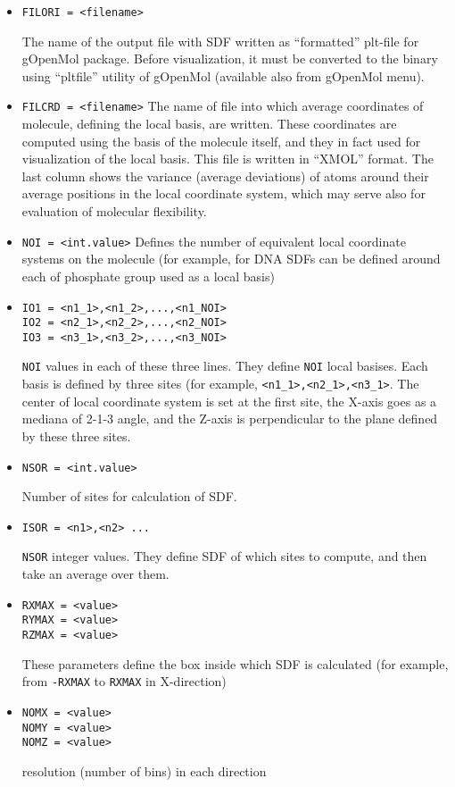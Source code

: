 \documentclass{article}
\begin{document}
\begin{itemize}

\item
\verb|FILORI = <filename>|

The name of the output file with SDF written as ``formatted'' plt-file
for gOpenMol package. Before visualization, it must be converted to the
binary using ``pltfile'' utility of gOpenMol (available also from gOpenMol 
menu).

\item
\verb|FILCRD = <filename>| 
The name of file into which average coordinates of molecule, defining the
local basis, are written. These coordinates are computed using the basis of
the molecule itself, and they in fact used for visualization of the local
basis. This file is written in ``XMOL'' format. The last column shows the
variance (average deviations) of atoms around their average positions in
the local coordinate system, which may serve also for evaluation of molecular
flexibility.

\item
\verb|NOI = <int.value>|
Defines the number of equivalent local coordinate systems on the molecule
(for example, for DNA SDFs can be defined around each of phosphate group 
used as a local basis)

\item
\begin{verbatim}
IO1 = <n1_1>,<n1_2>,...,<n1_NOI>
IO2 = <n2_1>,<n2_2>,...,<n2_NOI>
IO3 = <n3_1>,<n3_2>,...,<n3_NOI>
\end{verbatim}

\verb|NOI| values in each of these three lines. They define \verb|NOI|
local basises. Each basis is defined by three sites (for example,
\verb|<n1_1>,<n2_1>,<n3_1>|. The center of local coordinate system is set
at the first site, the X-axis goes as a mediana of 2-1-3 angle, and the
Z-axis is perpendicular to the plane defined by these three sites.

\item
\verb|NSOR = <int.value>|

Number of sites for calculation of SDF. 

\item
\verb|ISOR = <n1>,<n2> ...|

\verb|NSOR| integer values. They define SDF of which sites to compute,
and then take an average over them. 

\item
\begin{verbatim}
RXMAX = <value> 
RYMAX = <value> 
RZMAX = <value> 
\end{verbatim}
These parameters define the box inside which SDF is calculated
(for example, from \verb|-RXMAX| to \verb|RXMAX| in X-direction)

\item
\begin{verbatim}
NOMX = <value> 
NOMY = <value> 
NOMZ = <value> 
\end{verbatim}
resolution (number of bins) in each direction

\end{itemize}
\end{document}
